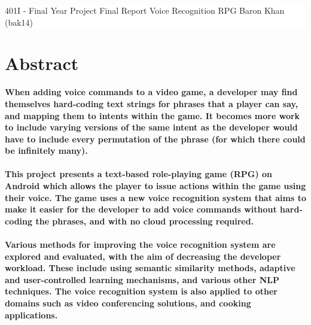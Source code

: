 \documentclass[11pt]{article}
\date{16 March 2017}
\begin{document}
\vspace*{6cm}
\colorbox{white}{
	\parbox[t]{1.0\linewidth}{
		\centering \fontsize{50pt}{80pt}\selectfont %
		\vspace*{0.7cm} %

		{401I - Final Year Project} \break
		\vspace*{0.7cm}
		Final Report
		\break
		Voice Recognition RPG
		\break
		Baron Khan (bak14)
		\vspace*{0.7cm} %
	}
}
\vfill %




\newpage
\thispagestyle{empty}
\tableofcontents
\newpage
\setcounter{page}{1}
\section{Abstract}

\textbf{When adding voice commands to a video game, a developer may find themselves hard-coding text strings for phrases that a player can say, and mapping them to intents within the game. It becomes more work to include varying versions of the same intent as the developer would have to include every permutation of the phrase (for which there could be infinitely many).
\\
\\
This project presents a text-based role-playing game (RPG) on Android which allows the player to issue actions within the game using their voice. The game uses a new voice recognition system that aims to make it easier for the developer to add voice commands without hard-coding the phrases, and with no cloud processing required.
\\
\\
Various methods for improving the voice recognition system are explored and evaluated, with the aim of decreasing the developer workload. These include using semantic similarity methods, adaptive and user-controlled learning mechanisms, and various other NLP techniques. The voice recognition system is also applied to other domains such as video conferencing solutions, and cooking applications.}

\newpage
\end{document}
